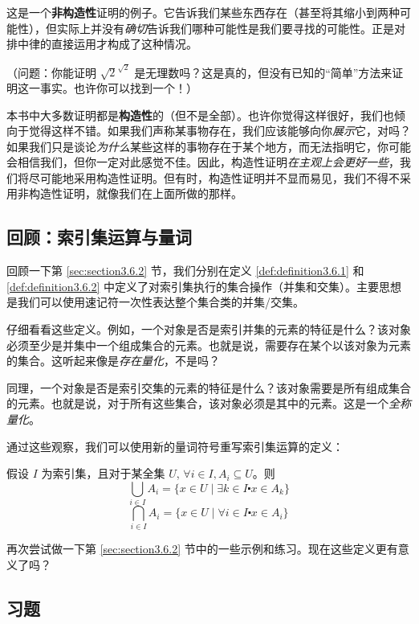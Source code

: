 这是一个\textbf{非构造性}证明的例子。它告诉我们某些东西存在（甚至将其缩小到两种可能性），但实际上并没有\emph{确切}告诉我们哪种可能性是我们要寻找的可能性。正是对排中律的直接运用才构成了这种情况。

（问题：你能证明 $\sqrt{2}^{\sqrt{2}}$ 是无理数吗？这是真的，但没有已知的``简单''方法来证明这一事实。也许你可以找到一个！）

本书中大多数证明都是\textbf{构造性}的（但不是全部）。也许你觉得这样很好，我们也倾向于觉得这样不错。如果我们声称某事物存在，我们应该能够向你\emph{展示}它，对吗？如果我们只是谈论\emph{为什么}某些这样的事物存在于某个地方，而无法指明它，你可能会相信我们，但你一定对此感觉不佳。因此，构造性证明\emph{在主观上会更好一些}，我们将尽可能地采用构造性证明。但有时，构造性证明并不显而易见，我们不得不采用非构造性证明，就像我们在上面所做的那样。

\subsection{回顾：索引集运算与量词}

回顾一下第 \ref{sec:section3.6.2} 节，我们分别在定义 \ref{def:definition3.6.1} 和 \ref{def:definition3.6.2} 中定义了对索引集执行的集合操作（并集和交集）。主要思想是我们可以使用速记符一次性表达整个集合类的并集/交集。

仔细看看这些定义。例如，一个对象是否是索引并集的元素的特征是什么？该对象必须至少是并集中一个组成集合的元素。也就是说，需要存在某个以该对象为元素的集合。这听起来像是\emph{存在量化}，不是吗？

同理，一个对象是否是索引交集的元素的特征是什么？该对象需要是所有组成集合的元素。也就是说，对于所有这些集合，该对象必须是其中的元素。这是一个\emph{全称量化}。

通过这些观察，我们可以使用新的量词符号重写索引集运算的定义：

\clearpage 

\begin{definition}
    假设 $I$ 为索引集，且对于某全集 $U$, $\forall i \in I, A_i \subseteq U$。则
    \[\bigcup_{i \in I} A_i = \{x \in U \mid \exists k \in I \centerdot x \in A_k\}\]
    \[\bigcap_{i \in I} A_i = \{x \in U \mid \forall i \in I \centerdot x \in A_i\}\]
\end{definition}

再次尝试做一下第 \ref{sec:section3.6.2} 节中的一些示例和练习。现在这些定义更有意义了吗？

\subsection{习题}

